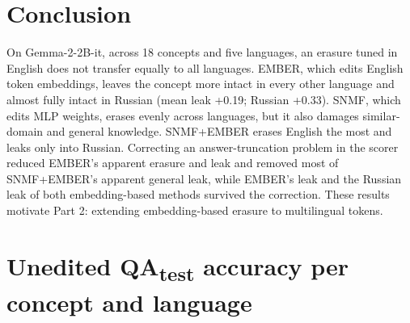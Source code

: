 \documentclass[11pt]{article}
\newcommand{\qatest}{\textsc{QA}\textsubscript{test}}
\begin{document}
\section{Conclusion}\label{sec:7}

On Gemma-2-2B-it, across 18 concepts and five languages, an erasure tuned in English does not transfer equally to all languages. EMBER, which edits English token embeddings, leaves the concept more intact in every other language and almost fully intact in Russian (mean leak +0.19; Russian +0.33). SNMF, which edits MLP weights, erases evenly across languages, but it also damages similar-domain and general knowledge. SNMF+EMBER erases English the most and leaks only into Russian. Correcting an answer-truncation problem in the scorer reduced EMBER's apparent erasure and leak and removed most of SNMF+EMBER's apparent general leak, while EMBER's leak and the Russian leak of both embedding-based methods survived the correction. These results motivate Part 2: extending embedding-based erasure to multilingual tokens.




\appendix
\renewcommand{\thetable}{\Alph{section}\arabic{table}}

\section{Unedited \qatest{} accuracy per concept and language}\label{app:A}
\setcounter{table}{0}
\end{document}
